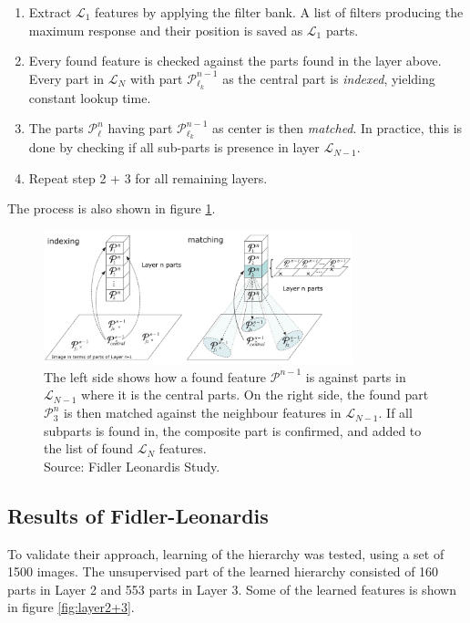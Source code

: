 \begin{enumerate}
	\item Extract $\mathcal{L}_1$ features by applying the filter bank. A list of filters producing the maximum response and their position is saved as $\mathcal{L}_1$ parts. 
	\item Every found feature is checked against the parts found in the layer above. 
	Every part in $\mathcal{L}_{N}$  with part $\mathcal{P}_{\ell_k}^{n-1}$ as the central part is \textit{indexed}, yielding constant lookup time. 
	\item The parts $\mathcal{P}_{\ell}^{n}$ having part $\mathcal{P}_{\ell_k}^{n-1}$ as center is then \textit{matched}. In practice, this is done by checking if all sub-parts is presence in layer $\mathcal{L}_{N-1}$.
	\item Repeat step 2 + 3 for all remaining layers.  
\end{enumerate}

The process is also shown in figure \ref{fig:indexing-matching}. 
\begin{figure}[h!] %
\centering
\includegraphics[width=0.8\textwidth]{graphics/indexing-matching}
\caption{The left side shows how a found feature $\mathcal{P}^{n-1}$ is against parts in $\mathcal{L}_{N-1}$ where it is the central parts. 
On the right side, the found part $\mathcal{P}_{3}^{n}$ is then matched against the neighbour features in $\mathcal{L}_{N-1}$. 
If all subparts is found in, the composite part is confirmed, and added to the list of found $\mathcal{L}_{N}$ features. \\
Source: Fidler Leonardis Study. }
\label{fig:indexing-matching}
\end{figure}

\subsection{Results of Fidler-Leonardis}
\label{sec:fidler-results}
To validate their approach, learning of the hierarchy was tested, using a set of 1500 images. 
The unsupervised part of the learned hierarchy consisted of 160 parts in Layer 2 and 553 parts in Layer 3. 
Some of the learned features is shown in figure \ref{fig:layer2+3}. 

